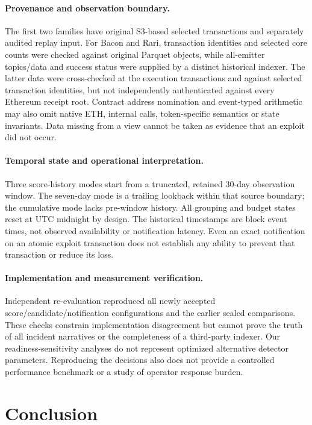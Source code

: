\documentclass[preprint,12pt,authoryear]{elsarticle}
\begin{document}
\paragraph{Provenance and observation boundary.} The first two families have original S3-based selected transactions and separately audited replay input. For Bacon and Rari, transaction identities and selected core counts were checked against original Parquet objects, while all-emitter topics/data and success status were supplied by a distinct historical indexer. The latter data were cross-checked at the execution transactions and against selected transaction identities, but not independently authenticated against every Ethereum receipt root. Contract address nomination and event-typed arithmetic may also omit native ETH, internal calls, token-specific semantics or state invariants. Data missing from a view cannot be taken as evidence that an exploit did not occur.

\paragraph{Temporal state and operational interpretation.} Three score-history modes start from a truncated, retained 30-day observation window. The seven-day mode is a trailing lookback within that source boundary; the cumulative mode lacks pre-window history. All grouping and budget states reset at UTC midnight by design. The historical timestamps are block event times, not observed availability or notification latency. Even an exact notification on an atomic exploit transaction does not establish any ability to prevent that transaction or reduce its loss.

\paragraph{Implementation and measurement verification.} Independent re-evaluation reproduced all newly accepted score/candidate/notification configurations and the earlier sealed comparisons. These checks constrain implementation disagreement but cannot prove the truth of all incident narratives or the completeness of a third-party indexer. Our readiness-sensitivity analyses do not represent optimized alternative detector parameters. Reproducing the decisions also does not provide a controlled performance benchmark or a study of operator response burden.

\section{Conclusion}\label{sec:conclusion}
\end{document}
